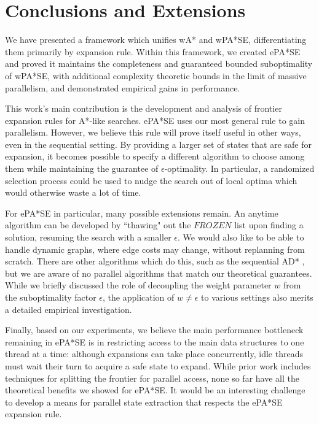 \documentclass[letterpaper]{article}
\begin{document}
\section{Conclusions and Extensions}

We have presented a framework which unifies wA* and wPA*SE, differentiating them primarily by expansion rule. Within this framework, we created ePA*SE and proved it maintains the completeness and guaranteed bounded suboptimality of wPA*SE, with additional complexity theoretic bounds in the limit of massive parallelism, and demonstrated empirical gains in performance.

This work's main contribution is the development and analysis of frontier expansion rules for A*-like searches. ePA*SE uses our most general rule to gain parallelism. However, we believe this rule will prove itself useful in other ways, even in the sequential setting. By providing a larger set of states that are safe for expansion, it becomes possible to specify a different algorithm to choose among them while maintaining the guarantee of $\epsilon$-optimality. In particular, a randomized selection process could be used to nudge the search out of local optima which would otherwise waste a lot of time.

For ePA*SE in particular, many possible extensions remain. An anytime algorithm can be developed by ``thawing" out the $FROZEN$ list upon finding a solution, resuming the search with a smaller $\epsilon$. We would also like to be able to handle dynamic graphs, where edge costs may change, without replanning from scratch. There are other algorithms which do this, such as the sequential AD* \cite{likhachev2005anytime}, but we are aware of no parallel algorithms that match our theoretical guarantees. While we briefly discussed the role of decoupling the weight parameter $w$ from the suboptimality factor $\epsilon$, the application of $w \ne \epsilon$ to various settings also merits a detailed empirical investigation.

Finally, based on our experiments, we believe the main performance bottleneck remaining in ePA*SE is in restricting access to the main data structures to one thread at a time: although expansions can take place concurrently, idle threads must wait their turn to acquire a safe state to expand. While prior work includes techniques for splitting the frontier for parallel access, none so far have all the theoretical benefits we showed for ePA*SE. It would be an interesting challenge to develop a means for parallel state extraction that respects the ePA*SE expansion rule.



\end{document}
